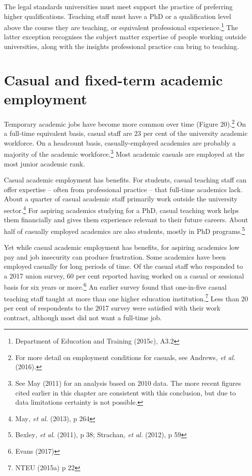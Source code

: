 \documentclass[]{book}
\begin{document}
The legal standards universities must meet support the practice of preferring higher qualifications. Teaching staff must have a PhD or a qualification level above the course they are teaching, or equivalent professional experience.\footnote{Department of Education and Training (2015c), A3.2} The latter exception recognises the subject matter expertise of people working outside universities, along with the insights professional practice can bring to teaching.

\hypertarget{casual-and-fixed-term-academic-employment}{%
\section{Casual and fixed-term academic employment }\label{casual-and-fixed-term-academic-employment}}

Temporary academic jobs have become more common over time (Figure 20).\footnote{For more detail on employment conditions for casuals, see Andrews\emph{, et al.} (2016).} On a full-time equivalent basis, casual staff are 23 per cent of the university academic workforce. On a headcount basis, casually-employed academics are probably a majority of the academic workforce.\footnote{See May (2011) for an analysis based on 2010 data. The more recent figures cited earlier in this chapter are consistent with this conclusion, but due to data limitations certainty is not possible.} Most academic casuals are employed at the most junior academic rank.

Casual academic employment has benefits. For students, casual teaching staff can offer expertise -- often from professional practice -- that full-time academics lack. About a quarter of casual academic staff primarily work outside the university sector.\footnote{May\emph{, et al.} (2013), p 264} For aspiring academics studying for a PhD, casual teaching work helps them financially and gives them experience relevant to their future careers. About half of casually employed academics are also students, mostly in PhD programs.\footnote{Bexley\emph{, et al.} (2011), p 38; Strachan\emph{, et al.} (2012), p 59}

Yet while casual academic employment has benefits, for aspiring academics low pay and job insecurity can produce frustration. Some academics have been employed casually for long periods of time. Of the casual staff who responded to a 2017 union survey, 60 per cent reported having worked on a casual or sessional basis for six years or more.\footnote{Evans (2017)} An earlier survey found that one-in-five casual teaching staff taught at more than one higher education institution.\footnote{NTEU (2015a) p 22} Less than 20 per cent of respondents to the 2017 survey were satisfied with their work contract, although most did not want a full-time job.
\end{document}

